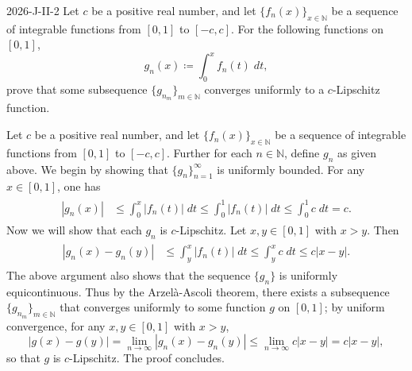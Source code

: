 \documentclass{article}
\begin{document}
	\begin{prb}{2026-J-II-2}
		Let $c$ be a positive real number, and let $\{f_{n}(x)\}_{x \in \mathbb{N}}$ be a sequence of integrable functions from $[0,1]$ to $[-c,c]$. For the following functions on $[0,1]$,
		\begin{equation*}
			g_{n}(x) \coloneqq \int_{0}^{x}f_{n}(t)\;dt, 
		\end{equation*}
		prove that some subsequence $\{g_{n_{m}}\}_{m \in \mathbb{N}}$ converges uniformly to a $c$-Lipschitz function. 
	\end{prb}
	Let $c$ be a positive real number, and let $\{f_{n}(x)\}_{x \in \mathbb{N}}$ be a sequence of integrable functions from $[0,1]$ to $[-c,c]$. Further for each $n \in \mathbb{N}$, define $g_{n}$ as given above. We begin by showing that $\{g_{n}\}_{n = 1}^{\infty}$ is uniformly bounded. For any $x \in [0,1]$, one has 
	\begin{align*}
		\begin{split}
			|g_{n}(x)| &\leq \int_{0}^{x}|f_{n}(t)|\;dt \leq \int_{0}^{1}|f_{n}(t)|\;dt \leq \int_{0}^{1}c\;dt = c. 
		\end{split}
	\end{align*}
	Now we will show that each $g_{n}$ is $c$-Lipschitz. Let $x, y \in [0,1]$ with $x > y$. Then 
	\begin{align*}
		\begin{split}
			|g_n(x) - g_n(y)| &\leq \int_{y}^{x}|f_{n}(t)|\;dt \leq \int_{y}^{x}c\;dt \leq c|x - y|. 
		\end{split}
	\end{align*}
	The above argument also shows that the sequence $\{g_{n}\}$ is uniformly equicontinuous. Thus by the Arzel\`a-Ascoli theorem, there exists a subsequence $\{g_{n_{m}}\}_{m \in \mathbb{N}}$ that converges uniformly to some function $g$ on $[0,1]$; by uniform convergence, for any $x, y \in [0,1]$ with $x > y$, 
	\begin{equation*}
		|g(x) - g(y)| = \lim_{n \to \infty}|g_{n}(x) - g_{n}(y)| \leq \lim_{n \to \infty}c|x - y| = c|x - y|,
	\end{equation*}
	so that $g$ is $c$-Lipschitz. The proof concludes. 
	
\end{document}
